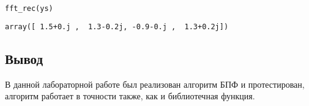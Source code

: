 \begin{lstlisting}[language=Python]
fft_rec(ys)
\end{lstlisting}
\begin{lstlisting}
array([ 1.5+0.j ,  1.3-0.2j, -0.9-0.j ,  1.3+0.2j])
\end{lstlisting}

\subsection{Вывод}

В данной лабораторной работе был реализован алгоритм БПФ и протестирован, алгоритм работает в точности также, как и библиотечная функция. 
